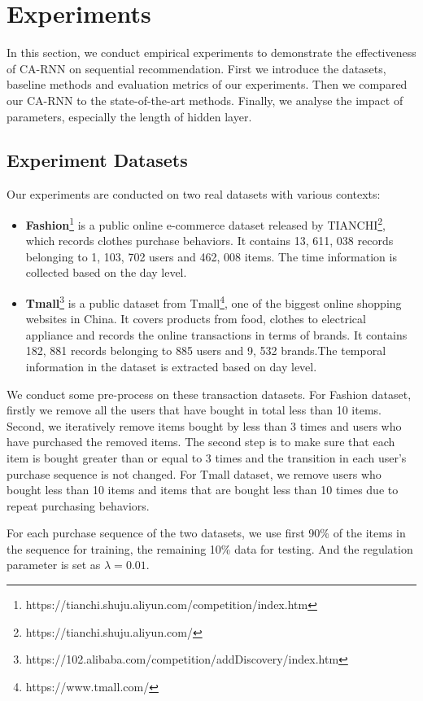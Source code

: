 \documentclass[conference]{IEEEtran}
\begin{document}
\section{Experiments}
In this section, we conduct empirical experiments to demonstrate the effectiveness of CA-RNN on sequential recommendation. First we introduce the datasets, baseline methods and evaluation metrics of our experiments. Then we compared our CA-RNN to the state-of-the-art methods. Finally, we analyse the impact of parameters, especially the length of hidden layer.
\subsection{Experiment Datasets}
Our experiments are conducted on two real datasets with various contexts:
\begin{itemize}
\item \textbf{Fashion}\footnote{https://tianchi.shuju.aliyun.com/competition/index.htm} is a public online e-commerce dataset released by TIANCHI\footnote{https://tianchi.shuju.aliyun.com/}, which records clothes purchase behaviors. It contains 13, 611, 038 records belonging to 1, 103, 702 users and 462, 008 items. The time information is collected based on the day level.

\item \textbf{Tmall}\footnote{https://102.alibaba.com/competition/addDiscovery/index.htm} is a public dataset from Tmall\footnote{https://www.tmall.com/}, one of the biggest online shopping websites in China. It covers products from food, clothes to electrical appliance and records the online transactions in terms of brands. It contains 182, 881 records belonging to 885 users and 9, 532 brands.The temporal information in the dataset is extracted based on day level.
\end{itemize}

We conduct some pre-process on these transaction datasets. For Fashion dataset, firstly we remove all the users that have bought in total less than 10 items. Second, we iteratively remove items bought by less than 3 times and users who have purchased the removed items. The second step is to make sure that each item is bought greater than or equal to 3 times and the transition in each user's purchase sequence is not changed. For Tmall dataset, we remove users who bought less than 10 items and items that are bought less than 10 times due to repeat purchasing behaviors.

For each purchase sequence of the two datasets, we use first 90\% of the items in the sequence for training, the remaining 10\% data for testing. And the regulation parameter is set as $\lambda = 0.01$.
\end{document}
